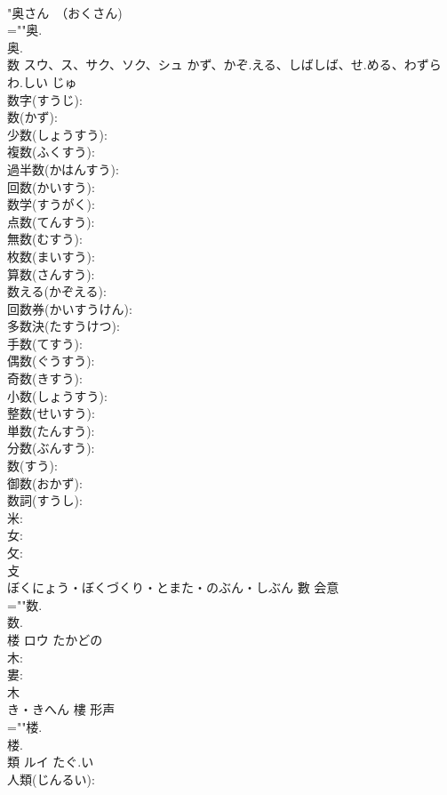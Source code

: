 \documentclass[8pt]{extreport}
\begin{document}
\begin{CJK}{UTF8}{min}
\\	"奥さん　（おくさん) 
\\	=""奥.
\\	奥.
\\	数	スウ、ス、サク、ソク、シュ	かず、かぞ.える、しばしば、せ.める、わずらわ.しい	じゅ	
\\	数字(すうじ): 
\\	数(かず): 
\\	少数(しょうすう): 
\\	複数(ふくすう): 
\\	過半数(かはんすう): 
\\	回数(かいすう): 
\\	数学(すうがく): 
\\	点数(てんすう): 
\\	無数(むすう): 
\\	枚数(まいすう): 
\\	算数(さんすう): 
\\	数える(かぞえる): 
\\	回数券(かいすうけん): 
\\	多数決(たすうけつ): 
\\	手数(てすう): 
\\	偶数(ぐうすう): 
\\	奇数(きすう): 
\\	小数(しょうすう): 
\\	整数(せいすう): 
\\	単数(たんすう): 
\\	分数(ぶんすう): 
\\	数(すう): 
\\	御数(おかず): 
\\	数詞(すうし): 
\\	米: 
\\	女: 
\\	攵: 
\\	攴	
\\	ぼくにょう・ぼくづくり・とまた・のぶん・しぶん	數	会意 
\\	=""数.
\\	数.
\\	楼	ロウ	たかどの		
\\	木: 
\\	婁: 
\\	木	
\\	き・きへん	樓	形声 
\\	=""楼.
\\	楼.
\\	類	ルイ	たぐ.い		
\\	人類(じんるい): 

\end{CJK}
\end{document}
